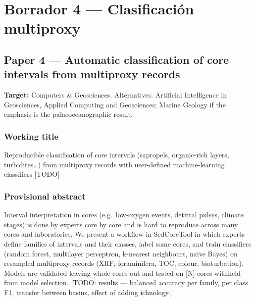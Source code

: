 \documentclass[
  10pt,
]{article}
\begin{document}
\newpage

\hypertarget{borrador-4-clasificaciuxf3n-multiproxy}{%
\section{Borrador 4 --- Clasificación
multiproxy}\label{borrador-4-clasificaciuxf3n-multiproxy}}

\hypertarget{paper-4-automatic-classification-of-core-intervals-from-multiproxy-records}{%
\subsection{Paper 4 --- Automatic classification of core intervals from
multiproxy
records}\label{paper-4-automatic-classification-of-core-intervals-from-multiproxy-records}}

\textbf{Target:} Computers \& Geosciences. Alternatives: Artificial
Intelligence in Geosciences, Applied Computing and Geosciences; Marine
Geology if the emphasis is the palaeoceanographic result.

\hypertarget{working-title-2}{%
\subsubsection{Working title}\label{working-title-2}}

Reproducible classification of core intervals (sapropels, organic-rich
layers, turbidites\ldots) from multiproxy records with user-defined
machine-learning classifiers {[}TODO{]}

\hypertarget{provisional-abstract-1}{%
\subsubsection{Provisional abstract}\label{provisional-abstract-1}}

Interval interpretation in cores (e.g.~low-oxygen events, detrital
pulses, climate stages) is done by experts core by core and is hard to
reproduce across many cores and laboratories. We present a workflow in
SedCoreTool in which experts define families of intervals and their
classes, label some cores, and train classifiers (random forest,
multilayer perceptron, k-nearest neighbours, naive Bayes) on resampled
multiproxy records (XRF, foraminifera, TOC, colour, bioturbation).
Models are validated leaving whole cores out and tested on {[}N{]} cores
withheld from model selection. {[}TODO: results --- balanced accuracy
per family, per class F1, transfer between basins, effect of adding
ichnology.{]}
\end{document}
